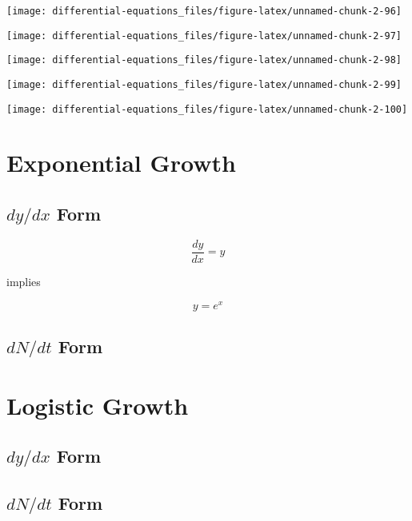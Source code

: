 \documentclass[]{tufte-handout}
\begin{document}
\begin{marginfigure}
\texttt{[image: differential-equations\_files/figure-latex/unnamed-chunk-2-96]} \end{marginfigure}
\begin{marginfigure}
\texttt{[image: differential-equations\_files/figure-latex/unnamed-chunk-2-97]} \end{marginfigure}
\begin{marginfigure}
\texttt{[image: differential-equations\_files/figure-latex/unnamed-chunk-2-98]} \end{marginfigure}
\begin{marginfigure}
\texttt{[image: differential-equations\_files/figure-latex/unnamed-chunk-2-99]} \end{marginfigure}
\begin{marginfigure}
\texttt{[image: differential-equations\_files/figure-latex/unnamed-chunk-2-100]} \end{marginfigure}

\hypertarget{exponential-growth}{%
\section{Exponential Growth}\label{exponential-growth}}

\hypertarget{dydx-form-1}{%
\subsection{\texorpdfstring{\(dy/dx\)
Form}{dy/dx Form}}\label{dydx-form-1}}

\[\frac{dy}{dx} = y\]

implies

\[y = e^x\]

\hypertarget{dndt-form-1}{%
\subsection{\texorpdfstring{\(dN/dt\)
Form}{dN/dt Form}}\label{dndt-form-1}}

\hypertarget{logistic-growth}{%
\section{Logistic Growth}\label{logistic-growth}}

\hypertarget{dydx-form-2}{%
\subsection{\texorpdfstring{\(dy/dx\)
Form}{dy/dx Form}}\label{dydx-form-2}}

\hypertarget{dndt-form-2}{%
\subsection{\texorpdfstring{\(dN/dt\)
Form}{dN/dt Form}}\label{dndt-form-2}}
\end{document}

